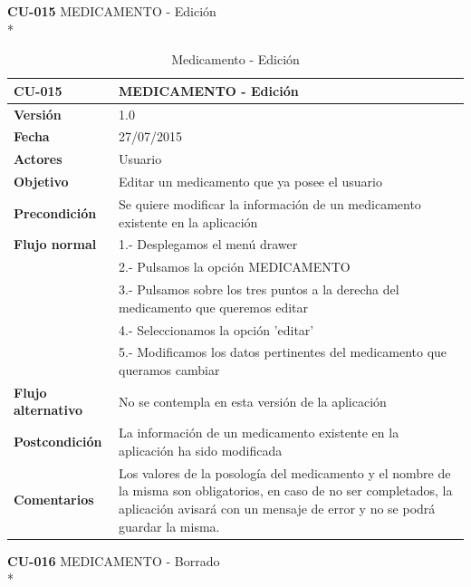 \documentclass[../pfc.tex]{subfiles}
\begin{document}
		\clearpage
		
		\textbf{CU-015}	MEDICAMENTO - Edición\\*
		
		\begin{table}[H]
			\centering
			\begin{tabular}[t]{|p{3cm}|p{9.5cm}|}
				\hline \textbf{CU-015} & \textbf{MEDICAMENTO - Edición} \\*
				\hline\hline \textbf{Versión} & 1.0 \\*
				\hline\hline \textbf{Fecha} & 27/07/2015 \\*
				\hline\textbf{Actores} 	& Usuario\\*
				\hline \textbf{Objetivo} & Editar un medicamento que ya posee el usuario\\* 			
				\hline \textbf{Precondición} & Se quiere modificar la información de un medicamento existente en la aplicación\\* 
				\hline \textbf{Flujo normal} & 1.- Desplegamos el menú drawer \\* 
				& 2.- Pulsamos la opción MEDICAMENTO\\*	
				& 3.- Pulsamos sobre los tres puntos a la derecha del medicamento que queremos editar\\*	
				& 4.- Seleccionamos la opción 'editar'\\*	
				& 5.- Modificamos los datos pertinentes del medicamento que queramos cambiar\\*	
				\hline \textbf{Flujo alternativo} & No se contempla en esta versión de la aplicación\\* 
				\hline \textbf{Postcondición} & La información de un medicamento existente en la aplicación ha sido modificada \\* 
				\hline \textbf{Comentarios}   & Los valores de la posología del medicamento y el nombre de la misma son obligatorios, en caso de no ser completados, la aplicación avisará con un mensaje de error y no se podrá guardar la misma.\\*
				\hline
			\end{tabular}
			\caption{Medicamento - Edición}
			\label{tabla:caso015}
		\end{table}
		
		
		\textbf{CU-016}	MEDICAMENTO - Borrado\\*
		
\end{document}
